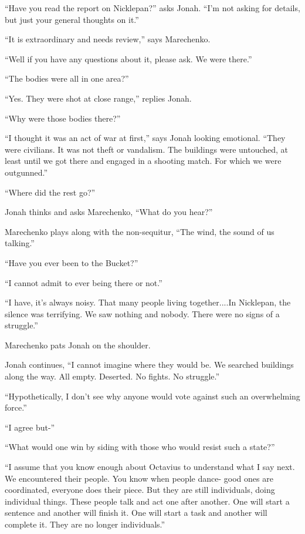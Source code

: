 ``Have you read the report on Nicklepan?'' asks Jonah.  ``I'm not asking for details, but just your general thoughts on it.''

``It is extraordinary and needs review,'' says Marechenko.

``Well if you have any questions about it, please ask.  We were there.''

``The bodies were all in one area?''

``Yes. They were shot at close range,'' replies Jonah.

``Why were those bodies there?''

``I thought it was an act of war at first,'' says Jonah looking emotional.  ``They were civilians.  It was not theft or vandalism.  The buildings were untouched, at least until we got there and engaged in a shooting match.  For which we were outgunned.''

``Where did the rest go?''

Jonah thinks and asks Marechenko, ``What do you hear?''

Marechenko plays along with the non-sequitur, ``The wind, the sound of us talking.''

``Have you ever been to the Bucket?''

``I cannot admit to ever being there or not.''

``I have, it's always noisy.  That many people living together....In Nicklepan, the silence was terrifying.  We saw nothing and nobody.  There were no signs of a struggle.''

Marechenko pats Jonah on the shoulder.

Jonah continues, ``I cannot imagine where they would be.  We searched buildings along the way.  All empty.  Deserted.  No fights.  No struggle.''

``Hypothetically, I don't see why anyone would vote against such an overwhelming force.''

``I agree but-''

``What would one win by siding with those who would resist such a state?''

``I assume that you know enough about Octavius to understand what I say next.  We encountered their people.  You know when people dance- good ones are coordinated, everyone does their piece.  But they are still individuals, doing individual things.  These people talk and act one after another.  One will start a sentence and another will finish it.  One will start a task and another will complete it.  They are no longer individuals.''

